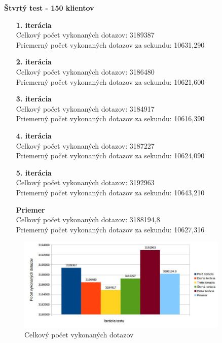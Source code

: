 \documentclass[12pt,oneside,final]{fithesis-utf8}
\begin{document}
\begin{itemize}
\textbf{Štvrtý test - 150 klientov}
\begin{itemize}

\item[\textbf{1. iterácia}]\ \\
Celkový počet vykonaných dotazov: 3189387\\
Priemerný počet vykonaných dotazov za sekundu: 10631,290

\item[\textbf{2. iterácia}]\ \\
Celkový počet vykonaných dotazov: 3186480\\
Priemerný počet vykonaných dotazov za sekundu: 10621,600

\item[\textbf{3. iterácia}]\ \\
Celkový počet vykonaných dotazov: 3184917\\
Priemerný počet vykonaných dotazov za sekundu: 10616,390

\item[\textbf{4. iterácia}]\ \\
Celkový počet vykonaných dotazov: 3187227\\
Priemerný počet vykonaných dotazov za sekundu: 10624,090

\item[\textbf{5. iterácia}]\ \\
Celkový počet vykonaných dotazov: 3192963\\
Priemerný počet vykonaných dotazov za sekundu: 10643,210

\item[\textbf{Priemer}]\ \\
Celkový počet vykonaných dotazov: 3188194,8\\
Priemerný počet vykonaných dotazov za sekundu: 10627,316

\end{itemize}

\begin{figure}[H]
  \centering
      \includegraphics[width=0.9\textwidth]{faban2_4.jpg}
  \caption{Celkový počet vykonaných dotazov}
\end{figure}


\end{itemize}
\end{document}
